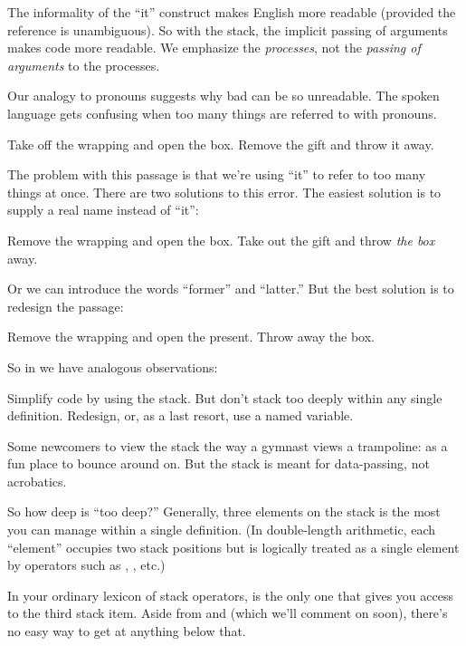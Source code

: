 The informality of the ``it'' construct makes English more readable
(provided the reference is unambiguous). So with the stack, the implicit
passing of arguments makes code more readable. We emphasize the
\emph{processes}, not the \emph{passing of arguments} to the processes.

Our analogy to pronouns suggests why bad \Forth{} can be so unreadable.
The spoken language gets confusing when too many things are
referred to with pronouns.

\begin{tfquot}
Take off the wrapping and open the box. Remove the gift and throw it
away.
\end{tfquot}
The problem with this passage is that we're using ``it'' to refer to too
many things at once. There are two solutions to this error. The easiest
solution is to supply a real name instead of ``it'':

\begin{tfquot}
Remove the wrapping and open the box. Take out the gift and throw
\emph{the box} away.
\end{tfquot}
Or we can introduce the words ``former'' and ``latter.'' But the best
solution is to redesign the passage:

\begin{tfquot}
Remove the wrapping and open the present. Throw away the box.
\end{tfquot}
So in \Forth{} we have analogous observations:

\begin{tip}
Simplify code by using the stack. But don't stack too deeply within any
single definition. Redesign, or, as a last resort, use a named variable.
\end{tip}
Some newcomers to \Forth{} view the stack the way a gymnast views a
trampoline: as a fun place to bounce around on. But the stack is meant for
data-passing, not acrobatics.

%
So how deep is ``too deep?'' Generally, three elements on the stack is
the most you can manage within a single definition. (In double-length
arithmetic, each ``element'' occupies two stack positions but is logically
treated as a single element by operators such as , ,
etc.)

In your ordinary lexicon of stack operators,  is the only one
that gives you access to the third stack item. Aside from  and
 (which we'll comment on soon), there's no easy way to get at
anything below that.

